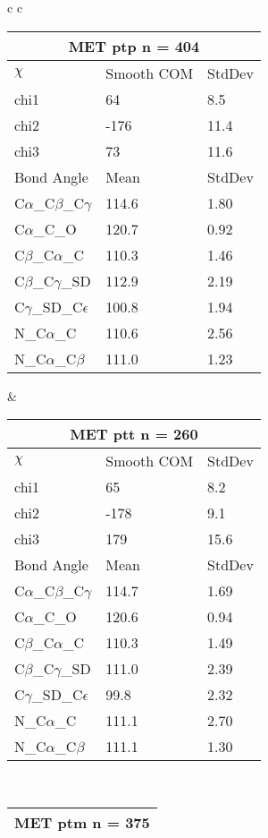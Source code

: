 \begin{longtable}{ c c }
  \begin{tabular}{ l l l }
  \toprule
  \multicolumn{3}{c}{MET \textbf{ptp} n = 404} \\ \toprule
  $\chi$       & Smooth COM & StdDev \\ \midrule
  chi1 & 64 & 8.5 \\ 
  chi2 & -176 & 11.4 \\ 
  chi3 & 73 & 11.6 \\ \midrule
  Bond Angle   & Mean     & StdDev \\ \midrule
  C$\alpha$\_C$\beta$\_C$\gamma$ & 114.6 & 1.80\\
  C$\alpha$\_C\_O & 120.7 & 0.92\\
  C$\beta$\_C$\alpha$\_C & 110.3 & 1.46\\
  C$\beta$\_C$\gamma$\_SD & 112.9 & 2.19\\
  C$\gamma$\_SD\_C$\epsilon$ & 100.8 & 1.94\\
  N\_C$\alpha$\_C & 110.6 & 2.56\\
  N\_C$\alpha$\_C$\beta$ & 111.0 & 1.23\\
  \bottomrule
  \end{tabular}
  &
  \begin{tabular}{ l l l }
  \toprule
  \multicolumn{3}{c}{MET \textbf{ptt} n = 260} \\ \toprule
  $\chi$       & Smooth COM & StdDev \\ \midrule
  chi1 & 65 & 8.2 \\ 
  chi2 & -178 & 9.1 \\ 
  chi3 & 179 & 15.6 \\ \midrule
  Bond Angle   & Mean     & StdDev \\ \midrule
  C$\alpha$\_C$\beta$\_C$\gamma$ & 114.7 & 1.69\\
  C$\alpha$\_C\_O & 120.6 & 0.94\\
  C$\beta$\_C$\alpha$\_C & 110.3 & 1.49\\
  C$\beta$\_C$\gamma$\_SD & 111.0 & 2.39\\
  C$\gamma$\_SD\_C$\epsilon$ & 99.8 & 2.32\\
  N\_C$\alpha$\_C & 111.1 & 2.70\\
  N\_C$\alpha$\_C$\beta$ & 111.1 & 1.30\\
  \bottomrule
  \end{tabular}
  \\
  \begin{tabular}{ l l l }
  \toprule
  \multicolumn{3}{c}{MET \textbf{ptm} n = 375} \\ \toprule

\end{tabular}
\end{longtable}
